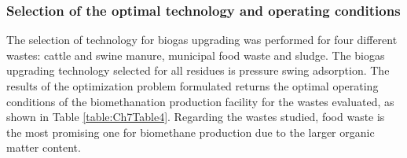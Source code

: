 \begin{refsection}[referencesCh7]
\subsubsection{Selection of the optimal technology and operating conditions}
The selection of technology for biogas upgrading was performed for four different wastes: cattle and swine manure, municipal food waste and sludge. The biogas upgrading technology selected for all
residues is pressure swing adsorption. The results of the optimization problem formulated returns the optimal operating conditions of the biomethanation production facility for the wastes evaluated, as shown in Table \ref{table:Ch7Table4}. Regarding the wastes studied, food waste is the most promising one for biomethane production due to the larger organic matter content.

\begin{table}[h]
	\centering
	\caption{Main process parameters for the selected technology, pressure swing adsorption.}
	\label{table:Ch7Table4}
\end{table}


\end{refsection}
